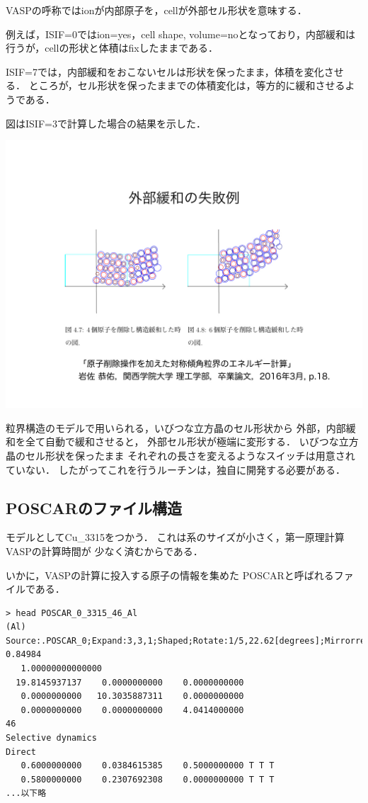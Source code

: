 VASPの呼称ではionが内部原子を，cellが外部セル形状を意味する．

例えば，ISIF=0ではion=yes，cell shape,
volume=noとなっており，内部緩和は行うが，cellの形状と体積はfixしたままである．

ISIF=7では，内部緩和をおこないセルは形状を保ったまま，体積を変化させる．
ところが，セル形状を保ったままでの体積変化は，等方的に緩和させるようである．

図はISIF=3で計算した場合の結果を示した．
\begin{center}
\includegraphics[width=150mm]{../.././thesis/thesis.004.jpeg}
\end{center}


\label{fig:}
粒界構造のモデルで用いられる，いびつな立方晶のセル形状から
外部，内部緩和を全て自動で緩和させると， 外部セル形状が極端に変形する．
いびつな立方晶のセル形状を保ったまま
それぞれの長さを変えるようなスイッチは用意されていない．
したがってこれを行うルーチンは，独自に開発する必要がある．

    \subsection{POSCARのファイル構造}\label{poscarux306eux30d5ux30a1ux30a4ux30ebux69cbux9020}

モデルとしてCu\_3315をつかう．
これは系のサイズが小さく，第一原理計算VASPの計算時間が
少なく済むからである．

いかに，VASPの計算に投入する原子の情報を集めた
POSCARと呼ばれるファイルである．

\begin{verbatim}
> head POSCAR_0_3315_46_Al
(Al) Source:.POSCAR_0;Expand:3,3,1;Shaped;Rotate:1/5,22.62[degrees];Mirrorred;Shaped2;Cut:0.81715-0.84984
   1.00000000000000
  19.8145937137    0.0000000000    0.0000000000
   0.0000000000   10.3035887311    0.0000000000
   0.0000000000    0.0000000000    4.0414000000
46
Selective dynamics
Direct
   0.6000000000    0.0384615385    0.5000000000 T T T
   0.5800000000    0.2307692308    0.0000000000 T T T
...以下略
\end{verbatim}

